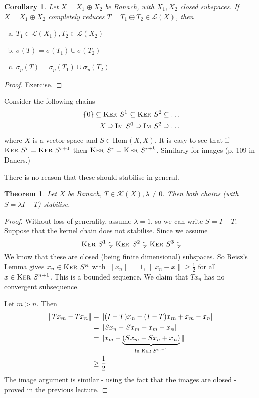 \documentclass[10pt, oneside, reqno]{amsbook}
\theoremstyle{plain}%
\newtheorem{thm}{Theorem}[section]
\newtheorem*{cor}{Corollary}
\theoremstyle{definition}
\theoremstyle{remark}
\newcommand{\im}{\textsc{Im\ }}
\renewcommand{\ker}{\textsc{Ker\ }}
\begin{document}
\begin{cor}
    Let $X = X_1 \oplus X_2$ be Banach, with $X_1, X_2$ closed subspaces.  If $X = X_1 \oplus X_2$ completely reduces $T = T_1 \oplus T_2 \in \mathcal L(X)$, then \begin{enumerate}[(a)]
        \item $T_1 \in \mathcal L(X_1), T_2 \in \mathcal L(X_2)$
        \item $\sigma(T) = \sigma(T_1) \cup \sigma(T_2)$ 
        \item $\sigma_p(T) = \sigma_p(T_1) \cup \sigma_p(T_2)$
    \end{enumerate}  
\end{cor}

\begin{proof}
    Exercise.
\end{proof}

Consider the following chains \begin{align*}
    \{ 0 \} \subseteq \ker S^1 \subseteq \ker S^2 \subseteq \dots \\
    X \supseteq \im S^1 \supseteq \im S^2 \supseteq \dots
\end{align*} where $X$ is a vector space and $S \in \text{Hom}(X, X)$.  It is easy to see that if $\ker S^r = \ker S^{r+1}$ then $\ker S^r = \ker S^{r+k}$.  Similarly for images (p. 109 in Daners.)

There is no reason that these should stabilise in general.
\begin{thm}
    Let $X$ be Banach, $T \in \mathcal K(X), \lambda \neq 0$.  Then both chains (with $S = \lambda I - T$) stabilise.  
\end{thm}
\begin{proof}
     Without loss of generality, assume $\lambda = 1$, so we can write $S = I - T$.  Suppose that the kernel chain does not stabilise.  Since we assume \[
        \ker S^1 \subsetneq \ker S^2 \subsetneq \ker S^3 \subsetneq
     \]  We know that these are closed (being finite dimensional) subspaces.  So Reisz's Lemma gives $x_n \in \ker S^n$ with $\| x_n \| = 1$, $\|x_n - x \| \geq \frac{1}{2}$ for all $x \in \ker S^{n+1}$. This is a bounded sequence.  We claim that $T x_n$ has no convergent subsequence.  
    
    Let $m > n$.  Then \begin{align*}
        \| Tx_m - Tx_n \|   &= \| ( I - T) x_n - (I-T) x_m + x_m - x_n \| \\
                            &= \| Sx_n - Sx_m - x_m - x_n \|\\
                            &= \| x_m - \underbrace{(S x_m  - S x_n  + x_n)}_\text{in $\ker S^{m-1}$} \| \\
                            &\geq \frac{1}{2}
    \end{align*}  The image argument is similar - using the fact that the images are closed - proved in the previous lecture.
\end{proof}
\end{document}
